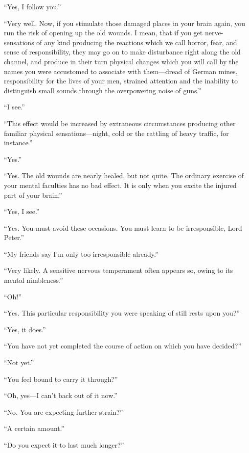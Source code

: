 \enquote{Yes, I follow you.}

\enquote{Very well. Now, if you stimulate those damaged places in your brain again, you run the risk of opening up the old wounds. I mean, that if you get nerve-sensations of any kind producing the reactions which we call horror, fear, and sense of responsibility, they may go on to make disturbance right along the old channel, and produce in their turn physical changes which you will call by the names you were accustomed to associate with them\allowbreak---\allowbreak dread of German mines, responsibility for the lives of your men, strained attention and the inability to distinguish small sounds through the overpowering noise of guns.}

\enquote{I see.}

\enquote{This effect would be increased by extraneous circumstances producing other familiar physical sensations\allowbreak---\allowbreak night, cold or the rattling of heavy traffic, for instance.}

\enquote{Yes.}

\enquote{Yes. The old wounds are nearly healed, but not quite. The ordinary exercise of your mental faculties has no bad effect. It is only when you excite the injured part of your brain.}

\enquote{Yes, I see.}

\enquote{Yes. You must avoid these occasions. You must learn to be irresponsible, Lord Peter.}

\enquote{My friends say I’m only too irresponsible already.}

\enquote{Very likely. A sensitive nervous temperament often appears so, owing to its mental nimbleness.}

\enquote{Oh!}

\enquote{Yes. This particular responsibility you were speaking of still rests upon you?}

\enquote{Yes, it does.}

\enquote{You have not yet completed the course of action on which you have decided?}

\enquote{Not yet.}

\enquote{You feel bound to carry it through?}

\enquote{Oh, yes\allowbreak---\allowbreak I can’t back out of it now.}

\enquote{No. You are expecting further strain?}

\enquote{A certain amount.}

\enquote{Do you expect it to last much longer?}

